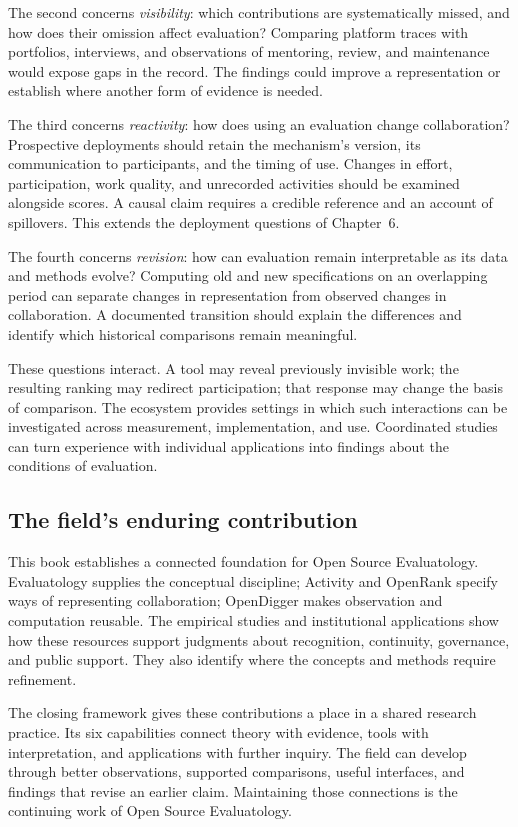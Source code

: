 The second concerns \emph{visibility}: which contributions are systematically missed, and how does their omission affect evaluation? Comparing platform traces with portfolios, interviews, and observations of mentoring, review, and maintenance would expose gaps in the record. The findings could improve a representation or establish where another form of evidence is needed.

The third concerns \emph{reactivity}: how does using an evaluation change collaboration? Prospective deployments should retain the mechanism's version, its communication to participants, and the timing of use. Changes in effort, participation, work quality, and unrecorded activities should be examined alongside scores. A causal claim requires a credible reference and an account of spillovers. This extends the deployment questions of Chapter~6.

The fourth concerns \emph{revision}: how can evaluation remain interpretable as its data and methods evolve? Computing old and new specifications on an overlapping period can separate changes in representation from observed changes in collaboration. A documented transition should explain the differences and identify which historical comparisons remain meaningful.

These questions interact. A tool may reveal previously invisible work; the resulting ranking may redirect participation; that response may change the basis of comparison. The ecosystem provides settings in which such interactions can be investigated across measurement, implementation, and use. Coordinated studies can turn experience with individual applications into findings about the conditions of evaluation.

\subsection{The field's enduring contribution}
This book establishes a connected foundation for Open Source Evaluatology. Evaluatology supplies the conceptual discipline; Activity and OpenRank specify ways of representing collaboration; OpenDigger makes observation and computation reusable. The empirical studies and institutional applications show how these resources support judgments about recognition, continuity, governance, and public support. They also identify where the concepts and methods require refinement.

The closing framework gives these contributions a place in a shared research practice. Its six capabilities connect theory with evidence, tools with interpretation, and applications with further inquiry. The field can develop through better observations, supported comparisons, useful interfaces, and findings that revise an earlier claim. Maintaining those connections is the continuing work of Open Source Evaluatology.
